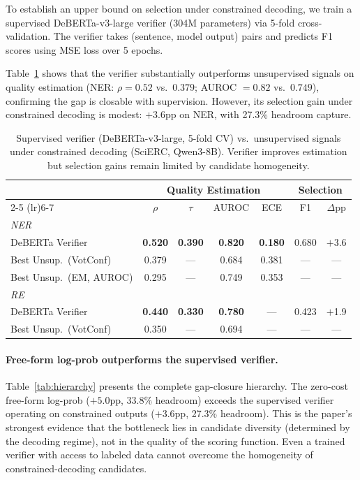 \documentclass[11pt,a4paper]{article}
\newcommand{\bmark}[1]{\textbf{#1}}
\begin{document}
To establish an upper bound on selection under constrained decoding, we train a supervised DeBERTa-v3-large verifier (304M parameters) via 5-fold cross-validation. The verifier takes (sentence, model output) pairs and predicts F1 scores using MSE loss over 5 epochs.

Table~\ref{tab:verifier} shows that the verifier substantially outperforms unsupervised signals on quality estimation (NER: $\rho = 0.52$ vs.\ $0.379$; AUROC $= 0.82$ vs.\ $0.749$), confirming the gap is closable with supervision. However, its selection gain under constrained decoding is modest: $+3.6$pp on NER, with 27.3\% headroom capture.

\begin{table}[t]
\centering
\caption{Supervised verifier (DeBERTa-v3-large, 5-fold CV) vs.\ unsupervised signals under constrained decoding (SciERC, Qwen3-8B). Verifier improves estimation but selection gains remain limited by candidate homogeneity.}
\label{tab:verifier}
\small
\begin{tabular}{l cccc cc}
\toprule
& \multicolumn{4}{c}{\textbf{Quality Estimation}} & \multicolumn{2}{c}{\textbf{Selection}} \\
\cmidrule(lr){2-5} \cmidrule(lr){6-7}
& $\rho$ & $\tau$ & AUROC & ECE & F1 & $\Delta$pp \\
\midrule
\multicolumn{7}{l}{\emph{NER}} \\
\quad DeBERTa Verifier & \bmark{0.520} & \bmark{0.390} & \bmark{0.820} & \bmark{0.180} & 0.680 & $+$3.6 \\
\quad Best Unsup.\ (VotConf) & 0.379 & --- & 0.684 & 0.381 & --- & --- \\
\quad Best Unsup.\ (EM, AUROC) & 0.295 & --- & 0.749 & 0.353 & --- & --- \\
\midrule
\multicolumn{7}{l}{\emph{RE}} \\
\quad DeBERTa Verifier & \bmark{0.440} & \bmark{0.330} & \bmark{0.780} & --- & 0.423 & $+$1.9 \\
\quad Best Unsup.\ (VotConf) & 0.350 & --- & 0.694 & --- & --- & --- \\
\bottomrule
\end{tabular}
\end{table}

\paragraph{Free-form log-prob outperforms the supervised verifier.}
Table~\ref{tab:hierarchy} presents the complete gap-closure hierarchy. The zero-cost free-form log-prob ($+5.0$pp, 33.8\% headroom) exceeds the supervised verifier operating on constrained outputs ($+3.6$pp, 27.3\% headroom). This is the paper's strongest evidence that the bottleneck lies in candidate diversity (determined by the decoding regime), not in the quality of the scoring function. Even a trained verifier with access to labeled data cannot overcome the homogeneity of constrained-decoding candidates.
\end{document}

